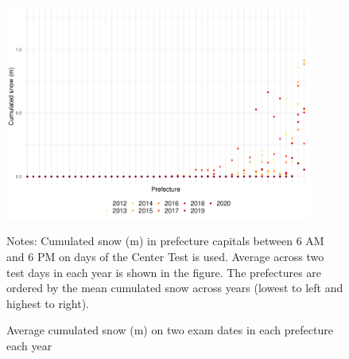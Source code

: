 \documentclass[12pt,letterpaper]{article}
\begin{document}
\begin{figure}[H]
  \centering
  \caption{Average cumulated snow (m) on two exam dates in each prefecture each year}
  \includegraphics[width = 0.9\textwidth]{../Output/images/cum_snow_diff.pdf}
  \label{fig:cum_snow_diff}
  \footnotesize
  \begin{tablenotes}
    \item Notes:
      Cumulated snow (m) in prefecture capitals between 6 AM and 6 PM on days of the Center Test is used.
      Average across two test days in each year is shown in the figure.
      The prefectures are ordered by the mean cumulated snow across years (lowest to left and highest to right).
  \end{tablenotes}
\end{figure}
\end{document}
